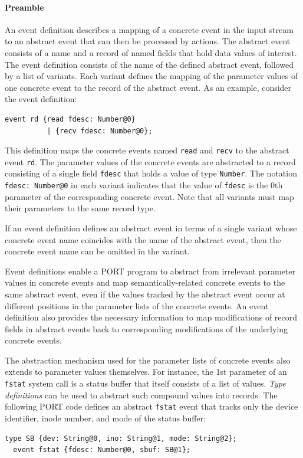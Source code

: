 \paragraph*{Preamble}

An event definition describes a mapping of a concrete event in the input stream to an abstract event that can then be processed by actions. The abstract event consists of a name and a record of named fields that hold data values of interest. The event definition consists of the name of the defined abstract event, followed by a list of variants. Each variant defines the mapping of the parameter values of one concrete event to the record of the abstract event. As an example, consider the event definition:
\begin{lstlisting}[numbers=none,xleftmargin=0em,gobble=2,columns=strict]
  event rd {read fdesc: Number@0}
          | {recv fdesc: Number@0};
\end{lstlisting}
This definition maps the concrete events named \lstinline+read+ and \lstinline+recv+ to the abstract event \lstinline+rd+. The parameter values of the concrete events are abstracted to a record consisting of a single field \lstinline+fdesc+ that holds a value of type \lstinline+Number+. The notation \lstinline+fdesc: Number@0+ in each variant indicates that the value of \lstinline+fdesc+ is the 0th parameter of the corresponding concrete event. Note that all variants must map their parameters to the same record type.

If an event definition defines an abstract event in terms of a single variant whose concrete event name coincides with the name of the abstract event, then the concrete event name can be omitted in the variant.

Event definitions enable a PORT program to abstract from irrelevant parameter values in concrete events and map semantically-related concrete events to the same abstract event, even if the values tracked by the abstract event occur at different positions in the parameter lists of the concrete events. An event definition also provides the necessary information to map modifications of record fields in abstract events back to corresponding modifications of the underlying concrete events.

The abstraction mechanism used for the parameter lists of concrete events also extends to parameter values themselves. For instance, the 1st parameter of an \lstinline+fstat+ system call is a status buffer that itself consists of a list of values. \emph{Type definitions} can be used to abstract such compound values into records. The following PORT code defines an abstract \lstinline+fstat+ event that tracks only the device identifier, inode number, and mode of the status buffer:
\begin{lstlisting}[numbers=none,xleftmargin=0em,gobble=2]
  type SB {dev: String@0, ino: String@1, mode: String@2};
  event fstat {fdesc: Number@0, sbuf: SB@1};
\end{lstlisting}

